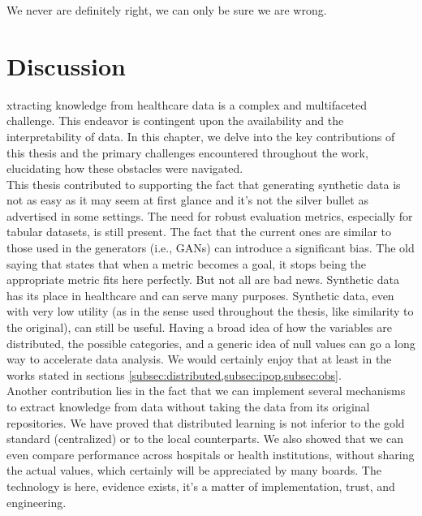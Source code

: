 
\begin{savequote}[75mm]
We never are definitely right, we can only be sure we are wrong.
\end{savequote}
\chapter{Discussion} \label{chap:disc}



xtracting knowledge from healthcare data is a complex and multifaceted challenge. This endeavor is contingent upon the availability and the interpretability of data. In this chapter, we delve into the key contributions of this thesis and the primary challenges encountered throughout the work, elucidating how these obstacles were navigated. \\

This thesis contributed to supporting the fact that generating synthetic data is not as easy as it may seem at first glance and it's not the silver bullet as advertised in some settings. The need for robust evaluation metrics, especially for tabular datasets, is still present. The fact that the current ones are similar to those used in the generators (i.e., GANs) can introduce a significant bias. The old saying that states that when a metric becomes a goal, it stops being the appropriate metric fits here perfectly. But not all are bad news. Synthetic data has its place in healthcare and can serve many purposes. Synthetic data, even with very low utility (as in the sense used throughout the thesis, like similarity to the original), can still be useful. Having a broad idea of how the variables are distributed, the possible categories, and a generic idea of null values can go a long way to accelerate data analysis. We would certainly enjoy that at least in the works stated in sections \ref{subsec:distributed,subsec:ipop,subsec:obs}. \\

Another contribution lies in the fact that we can implement several mechanisms to extract knowledge from data without taking the data from its original repositories. We have proved that distributed learning is not inferior to the gold standard (centralized) or to the local counterparts. We also showed that we can even compare performance across hospitals or health institutions, without sharing the actual values, which certainly will be appreciated by many boards. The technology is here, evidence exists, it's a matter of implementation, trust, and engineering. \\

